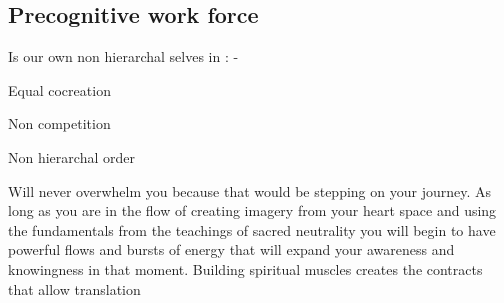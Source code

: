 \subsection{Precognitive work force}\label{precognitive-work-force}

Is our own non hierarchal selves in : -

Equal cocreation

Non competition

Non hierarchal order

Will never overwhelm you because that would be stepping on your journey.
As long as you are in the flow of creating imagery from your heart space
and using the fundamentals from the teachings of sacred neutrality you
will begin to have powerful flows and bursts of energy that will expand
your awareness and knowingness in that moment. Building spiritual
muscles creates the contracts that allow translation

